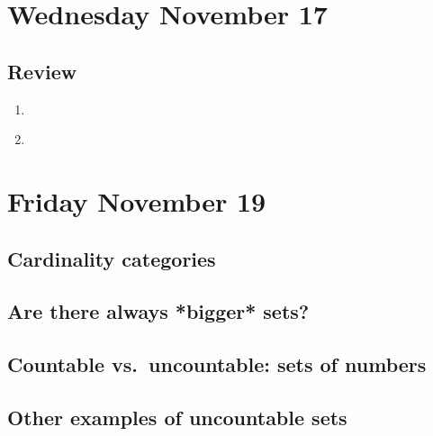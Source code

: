 \documentclass[12pt, oneside]{article}
\begin{document}
\section*{Wednesday November 17}

\vspace{100pt}

\newpage



\newpage
\subsection*{Review}
\begin{enumerate}
    \item  
    \item \hspace{1in}\\ 
\end{enumerate}

\newpage
\section*{Friday November 19}
\subsection*{Cardinality categories}


\newpage
\subsection*{Are there always *bigger* sets?}

\newpage
\subsection*{Countable vs.\ uncountable: sets of numbers}

\subsection*{Other examples of uncountable sets}

\newpage
\end{document}
